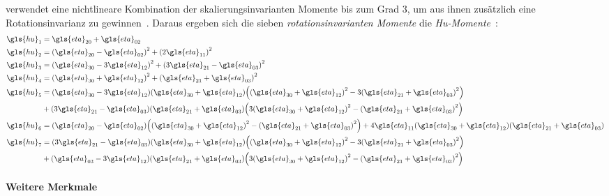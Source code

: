 \citeauthor{Hu} verwendet eine nichtlineare Kombination der skalierungsinvarianten Momente bis zum Grad $3$, um aus ihnen zusätzlich eine Rotationsinvarianz zu gewinnen~\cite{Hu, momente}.
Daraus ergeben sich die sieben \emph{rotationsinvarianten Momente} \bzw{} die \emph{Hu-Momente}~\cite{momente}:
\begin{equation*}
\begin{split}
  \gls{hu}_1 & = \gls{eta}_{20} + \gls{eta}_{02}\\
  \gls{hu}_2 & = {\left(\gls{eta}_{20} - \gls{eta}_{02}\right)}^2 + {\left(2\gls{eta}_{11}\right)}^2\\
  \gls{hu}_3 & = {\left(\gls{eta}_{30} - 3\gls{eta}_{12}\right)}^2 + {\left(3\gls{eta}_{21} - \gls{eta}_{03}\right)}^2\\
  \gls{hu}_4 & = {\left(\gls{eta}_{30} + \gls{eta}_{12}\right)}^2 + {\left(\gls{eta}_{21} + \gls{eta}_{03}\right)}^2\\
  \gls{hu}_5 & = \left(\gls{eta}_{30} - 3\gls{eta}_{12}\right)\left(\gls{eta}_{30} + \gls{eta}_{12}\right) \left({\left(\gls{eta}_{30} + \gls{eta}_{12}\right)}^2 - 3{\left(\gls{eta}_{21} + \gls{eta}_{03}\right)}^2\right)\\
  & + \left(3\gls{eta}_{21} - \gls{eta}_{03}\right)\left(\gls{eta}_{21} + \gls{eta}_{03}\right) \left(3{\left(\gls{eta}_{30} + \gls{eta}_{12}\right)}^2 - {\left(\gls{eta}_{21} + \gls{eta}_{03}\right)}^2\right)\\
  \gls{hu}_6 & = \left(\gls{eta}_{20} - \gls{eta}_{02}\right)\left({\left(\gls{eta}_{30} + \gls{eta}_{12}\right)}^2 - {\left(\gls{eta}_{21} + \gls{eta}_{03}\right)}^2\right) + 4\gls{eta}_{11}\left(\gls{eta}_{30} + \gls{eta}_{12}\right)\left(\gls{eta}_{21} + \gls{eta}_{03}\right)\\
  \gls{hu}_7 & = \left(3\gls{eta}_{21} - \gls{eta}_{03}\right)\left(\gls{eta}_{30} + \gls{eta}_{12}\right) \left({\left(\gls{eta}_{30} + \gls{eta}_{12}\right)}^2 - 3{\left(\gls{eta}_{21} + \gls{eta}_{03}\right)}^2\right)\\
  & + \left(\gls{eta}_{03} - 3\gls{eta}_{12}\right)\left(\gls{eta}_{21} + \gls{eta}_{03}\right) \left(3{\left(\gls{eta}_{30} + \gls{eta}_{12}\right)}^2 - {\left(\gls{eta}_{21} + \gls{eta}_{03}\right)}^2\right)
\end{split}
\end{equation*}

\paragraph{Weitere Merkmale}
\label{weitere_merkmale}

